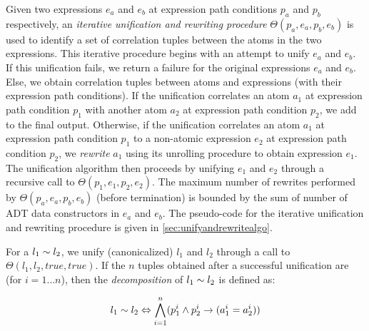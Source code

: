 Given two expressions $e_a$ and $e_b$ at expression path conditions $p_a$ and $p_b$
respectively, an {\em iterative unification and rewriting procedure}
$\Theta(p_a,e_a,p_b,e_b)$ is used to identify a set of correlation tuples
between the atoms in the two expressions.
This iterative procedure begins with an attempt to unify $e_a$ and $e_b$.
If this unification fails, we return a failure for the original expressions $e_a$ and $e_b$.
Else, we obtain correlation tuples between atoms and expressions
(with their expression path conditions).
If the unification correlates an atom $a_1$ at expression path condition $p_1$
with another atom $a_2$ at expression path condition $p_2$, we add  to the final output.
Otherwise, if the unification correlates an atom $a_1$ at expression path condition $p_1$
to a non-atomic expression $e_2$ at expression path condition $p_2$,
we {\em rewrite} $a_1$ using its unrolling procedure to obtain expression $e_1$.
The unification algorithm then proceeds by unifying $e_1$ and $e_2$ through
a recursive call to $\Theta(p_1,e_1,p_2,e_2)$.
The maximum number of rewrites performed by $\Theta(p_a,e_a,p_b,e_b)$ (before termination)
is bounded by the sum of number of ADT data constructors in $e_a$ and $e_b$.
The pseudo-code for the iterative unification and rewriting procedure is given in \cref{sec:unifyandrewritealgo}.

For a \recursiveRelation{} $l_1 \sim{} l_2$, we unify (canonicalized) $l_1$ and $l_2$ through a
call to $\Theta(l_1,l_2,true,true)$.
If the $n$ tuples obtained after a successful unification are 
(for $i=1\ldots n$), then the {\em decomposition} of $l_1 \sim{} l_2$ is defined as:

\begin{equation}
\label{eqn:decompose}
l_1 \sim{} l_2 \Leftrightarrow \bigwedge \limits_{i=1}^n (p_1^i \land p_2^i \rightarrow (a_1^i = a_2^i))
\end{equation}

